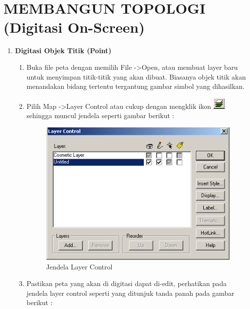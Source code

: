 \chapter{MEMBANGUN TOPOLOGI (Digitasi On-Screen)}

\begin{enumerate}[\bfseries A.]
  \item \textbf{Digitasi Objek Titik (Point)}
  
  \begin{enumerate}[1.]
    \item Buka file peta dengan memilih File -\textgreater Open, atau membuat layer baru untuk menyimpan titik-titik yang akan dibuat. Biasanya objek titik akan menandakan bidang tertentu tergantung gambar simbol yang dihasilkan.
    
    \item Pilih Map -\textgreater Layer Control atau cukup dengan mengklik ikon \includegraphics{./resources/052-a-ikon-layer-control} sehingga muncul jendela seperti gambar berikut :
    
    \begin{figure}[H]
      \centering
      \includegraphics[width=1\textwidth]{./resources/052-jendela-layer-control}
      \caption{Jendela Layer Control}
    \end{figure}
    
    \item Pastikan peta yang akan di digitasi dapat di-edit, perhatikan pada jendela layer control seperti yang ditunjuk tanda panah pada gambar berikut :
    

\end{enumerate}
\end{enumerate}
